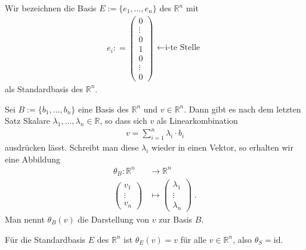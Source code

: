 \begin{Definition}
Wir bezeichnen die Basis $E:= \{ e_1, \hdots , e_n \}$ des $\mathbb{R}^n$ mit 
\begin{align*}
e_i : = \begin{pmatrix}
0 \\ \vdots \\ 0 \\ 1  \\ 0 \\ \vdots \\ 0
\end{pmatrix}
\begin{matrix}
 \\   \\  \leftarrow \text{i-te Stelle}  \\ \\  \\ 
\end{matrix}
\end{align*}
als Standardbasis des $\mathbb{R}^n$.
\end{Definition}

\begin{Definition}
Sei $B:= \{ b_1, \hdots , b_n \}$ eine Basis des $\mathbb{R}^n$ und $v \in \mathbb{R}^n$. Dann gibt es nach dem letzten Satz Skalare $\lambda_1, \hdots , \lambda_n \in \mathbb{R}$, so dass sich $v$ als Linearkombination 
\begin{align*}
v = \sum_{i=1}^n \lambda_i \cdot b_i 
\end{align*}
ausdrücken lässt. Schreibt man diese $\lambda_i$ wieder in einen Vektor, so erhalten wir eine Abbildung
\begin{align*}
\theta_B : \mathbb{R}^n & \to \mathbb{R}^n \\
\begin{pmatrix}
v_1 \\ \vdots \\ v_n
\end{pmatrix}
& \mapsto 
\begin{pmatrix}
\lambda_1 \\ \vdots \\ \lambda_n
\end{pmatrix} \; .
\end{align*}
Man nennt $\theta_B(v)$ die Darstellung von $v$ zur Basis $B$.
\end{Definition}

\begin{Bemerkung}
Für die Standardbasis $E$ des $\mathbb{R}^n$ ist $\theta_E(v) = v$ für alle $v \in \mathbb{R}^n$, also $\theta_S = \text{id}$.
\end{Bemerkung}

